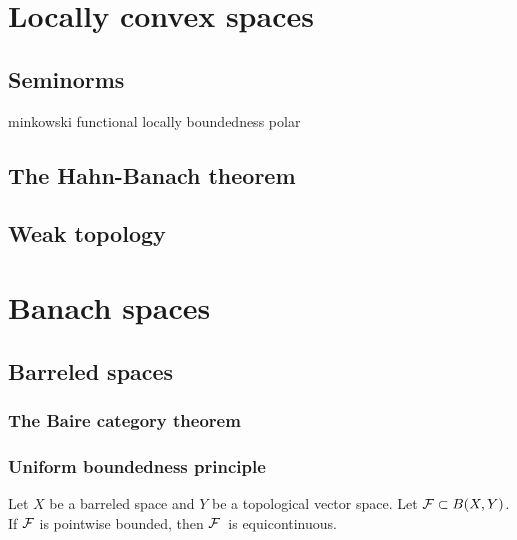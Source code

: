 \documentclass{../crs}
\begin{document}
\chapter{Locally convex spaces}
\section{Seminorms}
minkowski functional
locally boundedness
polar

\section{The Hahn-Banach theorem}

\section{Weak topology}





\chapter{Banach spaces}



\section{Barreled spaces}

\subsection{The Baire category theorem}

\subsection{Uniform boundedness principle}
\begin{thm}
Let $X$ be a barreled space and $Y$ be a topological vector space.
Let $\mathcal{F}\subset B(X,Y)$.
If $\mathcal{F}$ is pointwise bounded, then $\mathcal{F}$\ is equicontinuous.
\end{thm}
\end{document}
